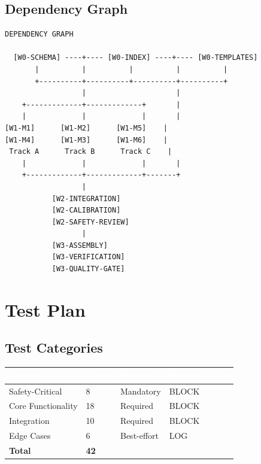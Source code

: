 \documentclass[11pt,letterpaper]{article}
\newcommand{\tableheader}[1]{\textbf{\sffamily\textcolor{white}{#1}}}
\begin{document}
\subsection{Dependency Graph}

\begin{asciibox}
\begin{verbatim}
DEPENDENCY GRAPH

  [W0-SCHEMA] ----+---- [W0-INDEX] ----+---- [W0-TEMPLATES]
       |          |          |          |          |
       +----------+----------+----------+----------+
                  |                     |
    +-------------+-------------+       |
    |             |             |       |
[W1-M1]      [W1-M2]      [W1-M5]    |
[W1-M4]      [W1-M3]      [W1-M6]    |
 Track A      Track B      Track C    |
    |             |             |       |
    +-------------+-------------+-------+
                  |
           [W2-INTEGRATION]
           [W2-CALIBRATION]
           [W2-SAFETY-REVIEW]
                  |
           [W3-ASSEMBLY]
           [W3-VERIFICATION]
           [W3-QUALITY-GATE]
\end{verbatim}
\end{asciibox}

\section{Test Plan}

\subsection{Test Categories}

\begin{center}
\begin{tabularx}{\textwidth}{L{3cm}C{1.5cm}C{1.5cm}C{2cm}}
\toprule
{}
\tableheader{Category} & \tableheader{Count} & \tableheader{Priority} & \tableheader{Failure Action} \\
\midrule
Safety-Critical & 8 & Mandatory & BLOCK \\
Core Functionality & 18 & Required & BLOCK \\
Integration & 10 & Required & BLOCK \\
Edge Cases & 6 & Best-effort & LOG \\
\midrule
\textbf{Total} & \textbf{42} & & \\
\bottomrule
\end{tabularx}
\end{center}
\end{document}
